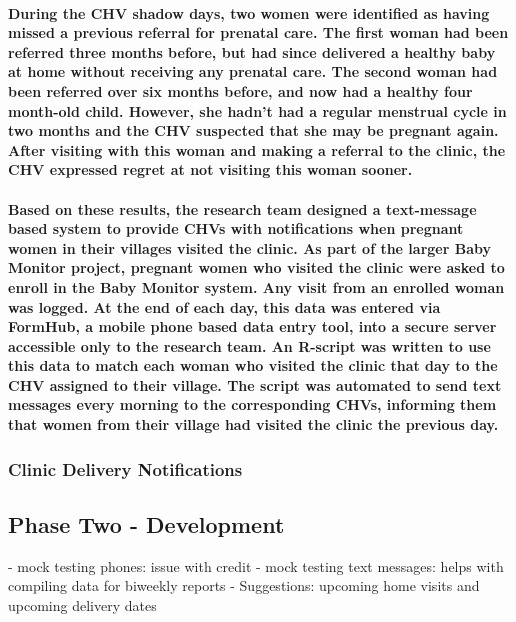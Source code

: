 \paragraph{During the CHV shadow days, two women were identified as having missed a previous referral for prenatal care. The first woman had been referred three months before, but had since delivered a healthy baby at home without receiving any prenatal care. The second woman had been referred over six months before, and now had a healthy four month-old child. However, she hadn’t had a regular menstrual cycle in two months and the CHV suspected that she may be pregnant again. After visiting with this woman and making a referral to the clinic, the CHV expressed regret at not visiting this woman sooner. }

\paragraph{Based on these results, the research team designed a text-message based system to provide CHVs with notifications when pregnant women in their villages visited the clinic.  As part of the larger Baby Monitor project, pregnant women who visited the clinic were asked to enroll in the Baby Monitor system. Any visit from an enrolled woman was logged. At the end of each day, this data was entered via FormHub, a mobile phone based data entry tool, into a secure server accessible only to the research team. An R-script was written to use this data to match each woman who visited the clinic that day to the CHV assigned to their village. The script was automated to send text messages every morning to the corresponding CHVs, informing them that women from their village had visited the clinic the previous day.}


\subsubsection{Clinic Delivery Notifications}
\paragraph{
}

\subsection{Phase Two - Development}
- mock testing phones: issue with credit
- mock testing text messages: helps with compiling data for biweekly reports
- Suggestions: upcoming home visits and upcoming delivery dates



